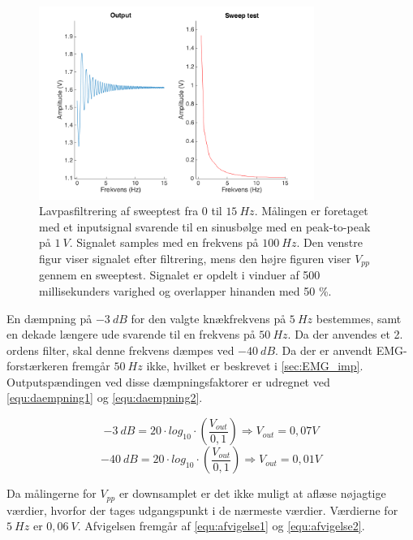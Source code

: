 \begin{figure}[H]
\centering
\includegraphics[width=0.8\textwidth]{figures/Lavpass_test}
\caption{Lavpasfiltrering af sweeptest fra 0 til $15~Hz$. Målingen er foretaget med et inputsignal svarende til en sinusbølge med en peak-to-peak på $1~V$. Signalet samples med en frekvens på $100~Hz$. Den venstre figur viser signalet efter filtrering, mens den højre figuren viser $V_{pp}$ gennem en sweeptest. Signalet er opdelt i vinduer af 500 millisekunders varighed og overlapper hinanden med 50 \%.}
\label{fig:lavps_sweep}
\end{figure}

\noindent
En dæmpning på $-3~dB$ for den valgte knækfrekvens på $5~Hz$ bestemmes, samt en dekade længere ude svarende til en frekvens på $50~Hz$. Da der anvendes et 2. ordens filter, skal denne frekvens dæmpes ved $-40~dB$. Da der er anvendt EMG-forstærkeren fremgår $50~Hz$ ikke, hvilket er beskrevet i \autoref{sec:EMG_imp}. Outputspændingen ved disse dæmpningsfaktorer er udregnet ved \autoref{equ:daempning1} og \autoref{equ:daempning2}. 

\begin{equation} \label{equ:daempning1}
-3~dB = 20 \cdot log_{10} \cdot (\frac{V_{out}}{0,1}) \Rightarrow V_{out} = 0,07 V
\end{equation}
\begin{equation} \label{equ:daempning2}
-40~dB = 20 \cdot log_{10} \cdot (\frac{V_{out}}{0,1}) \Rightarrow V_{out} = 0,01 V
\end{equation}

\noindent
Da målingerne for $V_{pp}$ er downsamplet er det ikke muligt at aflæse nøjagtige værdier, hvorfor der tages udgangspunkt i de nærmeste værdier. Værdierne for $5~Hz$ er $0,06~V$. Afvigelsen fremgår af \autoref{equ:afvigelse1} og \autoref{equ:afvigelse2}.

